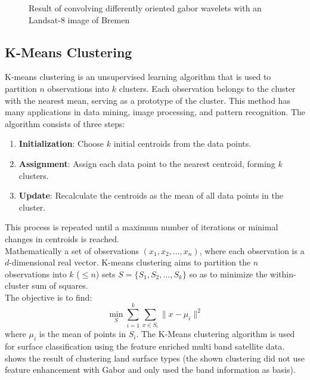 \documentclass[12pt,a4paper, english]{article}
\begin{document}
\begin{figure}[!htbp]
\begin{subfigure}[b]{0.45\textwidth}
         \label{fig:feat06}
     \end{subfigure}
        \caption{Result of convolving differently oriented gabor wavelets with an Landsat-8 image of Bremen}\label{fig:gaborExample}
    \end{figure}
%
\newpage
 \subsection{K-Means Clustering}\label{sec:kmeans}
K-means clustering is an unsupervised learning algorithm that is used to partition $n$ observations into $k$ clusters. 
Each observation belongs to the cluster with the nearest mean, serving as a prototype of the cluster. 
This method has many applications in data mining, image processing, and pattern recognition.
The algorithm consists of three steps:
\begin{enumerate}
    \item \textbf{Initialization}: Choose $k$ initial centroids from the data points.
    \item \textbf{Assignment}: Assign each data point to the nearest centroid, forming $k$ clusters.
    \item \textbf{Update}: Recalculate the centroids as the mean of all data points in the cluster. 
\end{enumerate}
This process is repeated until a maximum number of iterations or minimal changes in centroids is reached.\cite{Sinaga2020}\\ %
Mathematically a set of observations $(x_1, x_2, \ldots, x_n)$, where each observation is a $d$-dimensional real vector.
K-means clustering aims to partition the $n$ observations into $k$ ($\leq n$) sets $S = \{S_1, S_2, \ldots, S_k\}$ so as to minimize the within-cluster sum of squares. \\
The objective is to find:
\begin{equation}
    \min_{S} \sum_{i=1}^{k} \sum_{x \in S_i} \| x - \mu_i \|^2
\end{equation}
where $\mu_i$ is the mean of points in $S_i$.
%
The K-Means clustering algorithm is used for surface classification using the feature enriched multi band satellite data.
 shows the result of clustering land surface types (the shown clustering did not use feature enhancement with Gabor and only used the band information as basis).%
\end{document}
